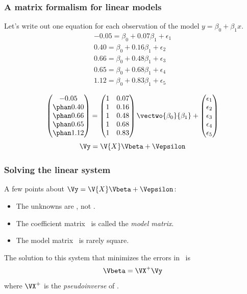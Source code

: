 \documentclass{beamer}
\begin{document}
\begin{frame}
\frametitle{A matrix formalism for linear models}
Let's write out one equation for each observation of the model $y = \beta_0 + \beta_1x$.
\begin{align*}
	-0.05 = \beta_0 + 0.07\beta_1 + \epsilon_1 \\
	0.40 = \beta_0 + 0.16\beta_1 + \epsilon_2 \\
	0.66 = \beta_0 + 0.48\beta_1 + \epsilon_3 \\
	0.65 = \beta_0 + 0.68\beta_1 + \epsilon_4 \\
	1.12 = \beta_0 + 0.83\beta_1 + \epsilon_5
\end{align*}

\pause
\[ \begin{pmatrix} -0.05\\ \phan0.40\\ \phan0.66\\ \phan0.65\\ \phan1.12 \end{pmatrix} = \begin{pmatrix} 1&0.07\\ 1&0.16\\ 1&0.48\\ 1&0.68\\ 1&0.83 \end{pmatrix} \vectwo{\beta_0}{\beta_1} + \begin{pmatrix} \epsilon_1\\ \epsilon_2\\ \epsilon_3\\ \epsilon_4\\ \epsilon_5 \end{pmatrix} \]
\pause
\[ \Vy = \V{X}\Vbeta+\Vepsilon \]	
\end{frame}

\begin{frame}
\frametitle{Solving the linear system}

A few points about $\Vy = \V{X}\Vbeta+\Vepsilon$:
\begin{itemize}
	\item The unknowns are \Vbeta, not .
	\item The coefficient matrix \ is called the \emph{model matrix}.
	\item The model matrix \ is rarely square.
\end{itemize}

\pause
The solution to this system that minimizes the errors in \Vepsilon\ is 
\[ \Vbeta = \VX^+\Vy \]
where $\VX^+$ is the \emph{pseudoinverse} of \VX.
\end{frame}
\end{document}

